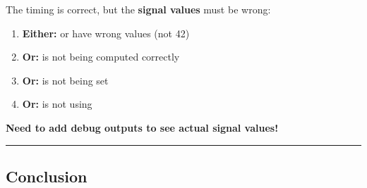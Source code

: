 \begin{record}

The timing is correct, but the \textbf{signal values} must be wrong:

\begin{enumerate}
\def\labelenumi{\arabic{enumi}.}
\tightlist
\item
  \textbf{Either:}  or  have wrong values
  (not 42)
\item
  \textbf{Or:}  is not being computed correctly
\item
  \textbf{Or:}  is not being set
\item
  \textbf{Or:}  is not using 
\end{enumerate}

\textbf{Need to add debug outputs to see actual signal values!}

\begin{center}\rule{0.5\linewidth}{0.5pt}\end{center}

\end{record}

\subsection{Conclusion}\label{cr:fix:timing-analysis:conclusion}

